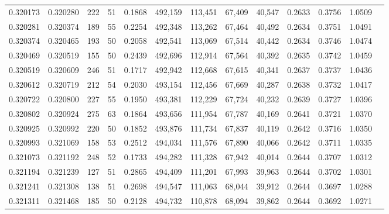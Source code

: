 \begin{tabular}{rrrrrrrrrrrrr}
0.320173 & 0.320280 &   222 &  51 &                                     0.1868 & 492,159 & 113,451 &  67,409 &  40,547 & 0.2633 & 0.3756 & 1.0509 \\
0.320281 & 0.320374 &   189 &  55 &                                     0.2254 & 492,348 & 113,262 &  67,464 &  40,492 & 0.2634 & 0.3751 & 1.0491 \\
0.320374 & 0.320465 &   193 &  50 &                                     0.2058 & 492,541 & 113,069 &  67,514 &  40,442 & 0.2634 & 0.3746 & 1.0474 \\
0.320469 & 0.320519 &   155 &  50 &                                     0.2439 & 492,696 & 112,914 &  67,564 &  40,392 & 0.2635 & 0.3742 & 1.0459 \\
0.320519 & 0.320609 &   246 &  51 &                                     0.1717 & 492,942 & 112,668 &  67,615 &  40,341 & 0.2637 & 0.3737 & 1.0436 \\
0.320612 & 0.320719 &   212 &  54 &                                     0.2030 & 493,154 & 112,456 &  67,669 &  40,287 & 0.2638 & 0.3732 & 1.0417 \\
0.320722 & 0.320800 &   227 &  55 &                                     0.1950 & 493,381 & 112,229 &  67,724 &  40,232 & 0.2639 & 0.3727 & 1.0396 \\
0.320802 & 0.320924 &   275 &  63 &                                     0.1864 & 493,656 & 111,954 &  67,787 &  40,169 & 0.2641 & 0.3721 & 1.0370 \\
0.320925 & 0.320992 &   220 &  50 &                                     0.1852 & 493,876 & 111,734 &  67,837 &  40,119 & 0.2642 & 0.3716 & 1.0350 \\
0.320993 & 0.321069 &   158 &  53 &                                     0.2512 & 494,034 & 111,576 &  67,890 &  40,066 & 0.2642 & 0.3711 & 1.0335 \\
0.321073 & 0.321192 &   248 &  52 &                                     0.1733 & 494,282 & 111,328 &  67,942 &  40,014 & 0.2644 & 0.3707 & 1.0312 \\
0.321194 & 0.321239 &   127 &  51 &                                     0.2865 & 494,409 & 111,201 &  67,993 &  39,963 & 0.2644 & 0.3702 & 1.0301 \\
0.321241 & 0.321308 &   138 &  51 &                                     0.2698 & 494,547 & 111,063 &  68,044 &  39,912 & 0.2644 & 0.3697 & 1.0288 \\
0.321311 & 0.321468 &   185 &  50 &                                     0.2128 & 494,732 & 110,878 &  68,094 &  39,862 & 0.2644 & 0.3692 & 1.0271 \\

\end{tabular}
